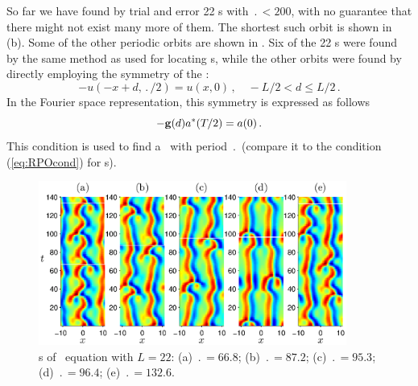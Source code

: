 So far we have found by trial and error 22 \po s 
with $\period{} < 200$, with no guarantee that there
might not exist many more of them.  The
shortest such orbit is shown in (b).  Some
of the other periodic orbits are shown in . Six
of the 22 \po s were found by the same method as used for locating
\rpo s, while the other orbits were found by directly employing the
symmetry of the \po:
\[ -u(-x+d,\period{}/2) = u(x,0)\,, \quad -L/2 < d \leq L/2\,.\]
In the Fourier space representation, this symmetry is expressed as
follows
\[
 -{\bf g}(d)a^\ast({T_{}}/2) = a(0)\,.
\]
This condition is used to find a \po\ with period $\period{}$ (compare it to
the condition (\ref{eq:RPOcond}) for \rpo s). 


\begin{figure}[t] \label{f:ks22rposPO}
\begin{center}
\includegraphics[width=0.9\textwidth]{figs/ks22rposPO.eps}
\end{center}
\caption{
\Po s of \KS\ equation with $L = 22$: (a) $\period{} =
66.8$; (b) $\period{} = 87.2$; (c) $\period{} = 95.3$; (d) $\period{} = 96.4$; (e) $\period{} =
132.6$.
        }
\end{figure}

